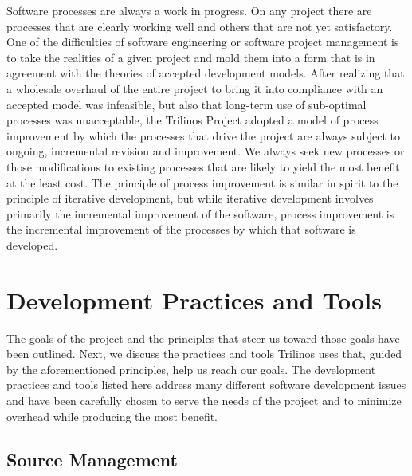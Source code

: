 \documentclass[times,10pt,twocolumn]{article}
\begin{document}
Software processes are always a work in progress.  On any project
there are processes that are clearly working well and others that
are not yet satisfactory. One of the difficulties of software
engineering or software project management is to take the realities
of a given project and mold them into a form that is in agreement
with the theories of accepted development models. After realizing
that a wholesale overhaul of the entire project to bring it into
compliance with an accepted model was infeasible, but also that
long-term use of sub-optimal processes was unacceptable, the
Trilinos Project adopted a model of process improvement by which the
processes that drive the project are always subject to ongoing,
incremental revision and improvement. We always seek new processes
or those modifications to existing processes that are likely to
yield the most benefit at the least cost.  The principle of process
improvement is similar in spirit to the principle of iterative
development, but while iterative development involves primarily the
incremental improvement of the software, process improvement is the
incremental improvement of the processes by which that software is
developed.




\section{Development Practices and Tools}
\label{Section:DevelopmentPracticesTools}

The goals of the project and the principles that steer us toward
those goals have been outlined.  Next, we discuss the practices and
tools Trilinos uses that, guided by the aforementioned principles,
help us reach our goals. The development practices and tools listed
here address many different software development issues and have
been carefully chosen to serve the needs of the project and to
minimize overhead while producing the most benefit.


\subsection{Source Management}

\end{document}
